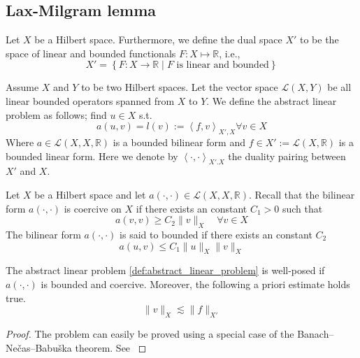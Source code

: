 \subsection{Lax-Milgram lemma}%
\label{sub:lax_milgram_lemma}


\begin{definition}
    \label{def:linear_function}
Let $X$ be a Hilbert space. Furthermore, we define the dual space $X' $ to be the space of linear and bounded functionals $F: X  \mapsto \mathbb{R} $, i.e., \[
X'  = \left\{ F: X \to \mathbb{R}   \mid  F \text{ is linear and bounded} \right\}
\]
\end{definition}

\begin{problem}
    \label{def:abstract_linear_problem}
    Assume $X$ and $Y$  to be two Hilbert spaces. Let the vector space $\mathcal{L}( X,Y)  $ be all linear bounded operators spanned from $X$ to $Y$. We define the abstract linear problem as follows; find $u \in X$ s.t. \[
    a( u,v)  = l(v ) := \left<f,v \right>_{X' , X}  \forall v \in X
    \]
    Where $a \in  \mathcal{L} ( X, X,\mathbb{R} ) $ is a bounded bilinear form and $f \in X':= \mathcal{L} ( X,\mathbb{R} )  $ is a bounded linear form. Here we denote by $\left<\cdot ,\cdot  \right>_{X' .X} $ the duality pairing between $X' $ and $X $.

\end{problem}


\begin{definition}
    \label{def:coercivity}
    Let $X$ be a Hilbert space and let $a( \cdot ,\cdot )  \in  \mathcal{L} ( X, X,\mathbb{R} )  $. Recall that the bilinear form $a( \cdot ,\cdot ) $ is coercive on $X$ if there exists an constant $C_{1} > 0 $ such that \[
     a( v,v) \ge  C_{2} \| v \|_{ X }^{  } \quad  \forall v \in  X
    \]
     The bilinear form $a( \cdot ,\cdot ) $ is said to bounded if there exists an constant $C_{2}$  \[
    a( u,v)  \le C_{1} \| u \|_{ X }^{  }  \| v \|_{X }^{  }
    \]
\end{definition}


\begin{lemma}
    \label{def:lax-milgram}
    The abstract linear problem \ref{def:abstract_linear_problem} is well-posed if $a(\cdot , \cdot  ) $ is bounded and coercive. Moreover, the following a priori estimate holds true.\[
    \| v \|_{ X }^{  } \lesssim  \| f \|_{ X'  }^{  }
    \]
\end{lemma}
\begin{proof}
    The problem can easily be proved using a special case of the Banach–Nečas–Babuška theorem. See \cite[Lemma 1.4]{pietro2012}
\end{proof}



